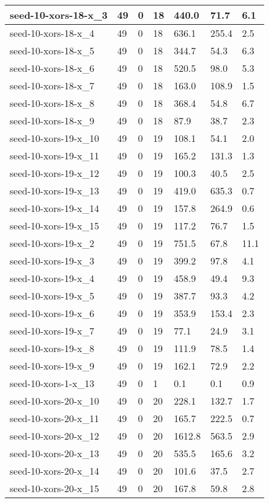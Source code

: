 \begin{scriptsize}
\begin{longtable}{|p{5cm}|l|l|l|l|l|l|}
seed-10-xors-18-x\_3&49&0&18&440.0&71.7&6.1 \\ \hline 
seed-10-xors-18-x\_4&49&0&18&636.1&255.4&2.5 \\ \hline 
seed-10-xors-18-x\_5&49&0&18&344.7&54.3&6.3 \\ \hline 
seed-10-xors-18-x\_6&49&0&18&520.5&98.0&5.3 \\ \hline 
seed-10-xors-18-x\_7&49&0&18&163.0&108.9&1.5 \\ \hline 
seed-10-xors-18-x\_8&49&0&18&368.4&54.8&6.7 \\ \hline 
seed-10-xors-18-x\_9&49&0&18&87.9&38.7&2.3 \\ \hline 
seed-10-xors-19-x\_10&49&0&19&108.1&54.1&2.0 \\ \hline 
seed-10-xors-19-x\_11&49&0&19&165.2&131.3&1.3 \\ \hline 
seed-10-xors-19-x\_12&49&0&19&100.3&40.5&2.5 \\ \hline 
seed-10-xors-19-x\_13&49&0&19&419.0&635.3&0.7 \\ \hline 
seed-10-xors-19-x\_14&49&0&19&157.8&264.9&0.6 \\ \hline 
seed-10-xors-19-x\_15&49&0&19&117.2&76.7&1.5 \\ \hline 
seed-10-xors-19-x\_2&49&0&19&751.5&67.8&11.1 \\ \hline 
seed-10-xors-19-x\_3&49&0&19&399.2&97.8&4.1 \\ \hline 
seed-10-xors-19-x\_4&49&0&19&458.9&49.4&9.3 \\ \hline 
seed-10-xors-19-x\_5&49&0&19&387.7&93.3&4.2 \\ \hline 
seed-10-xors-19-x\_6&49&0&19&353.9&153.4&2.3 \\ \hline 
seed-10-xors-19-x\_7&49&0&19&77.1&24.9&3.1 \\ \hline 
seed-10-xors-19-x\_8&49&0&19&111.9&78.5&1.4 \\ \hline 
seed-10-xors-19-x\_9&49&0&19&162.1&72.9&2.2 \\ \hline 
seed-10-xors-1-x\_13&49&0&1&0.1&0.1&0.9 \\ \hline 
seed-10-xors-20-x\_10&49&0&20&228.1&132.7&1.7 \\ \hline 
seed-10-xors-20-x\_11&49&0&20&165.7&222.5&0.7 \\ \hline 
seed-10-xors-20-x\_12&49&0&20&1612.8&563.5&2.9 \\ \hline 
seed-10-xors-20-x\_13&49&0&20&535.5&165.6&3.2 \\ \hline 
seed-10-xors-20-x\_14&49&0&20&101.6&37.5&2.7 \\ \hline 
seed-10-xors-20-x\_15&49&0&20&167.8&59.8&2.8 \\ \hline 

\end{longtable}
\end{scriptsize}
